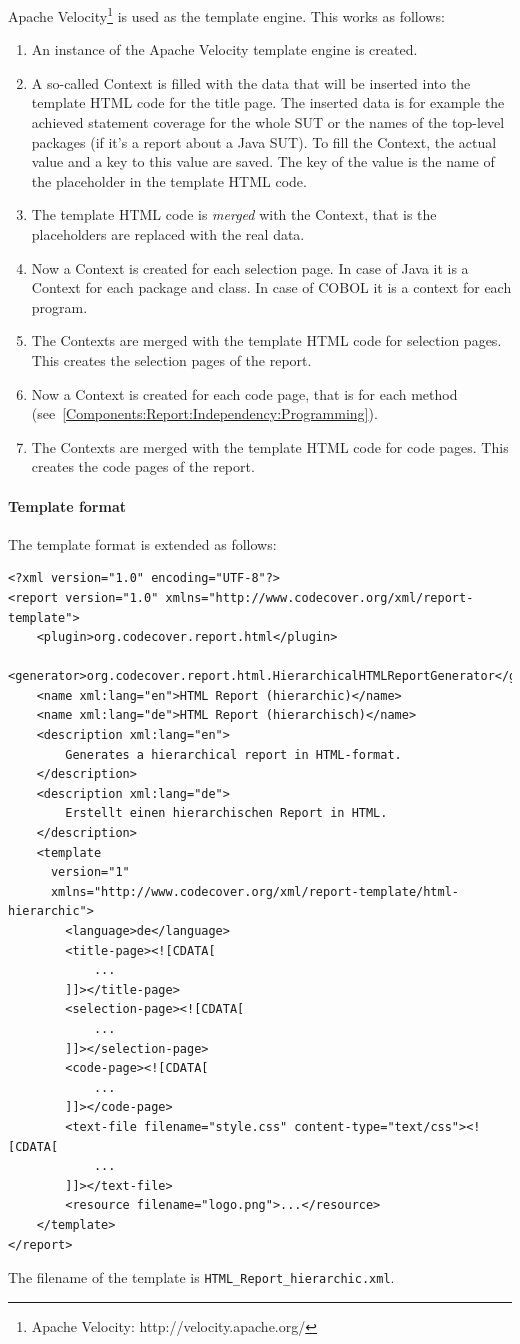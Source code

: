 Apache Velocity\footnote{Apache Velocity: http://velocity.apache.org/} is used as the template engine. This works as follows:
\begin{enumerate}
\item An instance of the Apache Velocity template engine is created.
\item A so-called Context is filled with the data that will be inserted into the template HTML code for the title page. The inserted data is for example the achieved statement coverage for the whole SUT or the names of the top-level packages (if it's a report about a Java SUT). To fill the Context, the actual value and a key to this value are saved. The key of the value is the name of the placeholder in the template HTML code.
\item The template HTML code is \emph{merged} with the Context, that is the placeholders are replaced with the real data.
\item Now a Context is created for each selection page. In case of Java it is a Context for each package and class. In case of COBOL it is a context for each program.
\item The Contexts are merged with the template HTML code for selection pages. This creates the selection pages of the report.
\item Now a Context is created for each code page, that is for each method (see~\ref{Components:Report:Independency:Programming}).
\item The Contexts are merged with the template HTML code for code pages. This creates the code pages of the report.
\end{enumerate}

\paragraph{Template format}

The template format is extended as follows:
\begin{verbatim}
<?xml version="1.0" encoding="UTF-8"?>
<report version="1.0" xmlns="http://www.codecover.org/xml/report-template">
    <plugin>org.codecover.report.html</plugin>
    <generator>org.codecover.report.html.HierarchicalHTMLReportGenerator</generator>
    <name xml:lang="en">HTML Report (hierarchic)</name>
    <name xml:lang="de">HTML Report (hierarchisch)</name>
    <description xml:lang="en">
        Generates a hierarchical report in HTML-format.
    </description>
    <description xml:lang="de">
        Erstellt einen hierarchischen Report in HTML.
    </description>
    <template
      version="1"
      xmlns="http://www.codecover.org/xml/report-template/html-hierarchic">
        <language>de</language>
        <title-page><![CDATA[
            ...
        ]]></title-page>
        <selection-page><![CDATA[
            ...
        ]]></selection-page>
        <code-page><![CDATA[
            ...
        ]]></code-page>
        <text-file filename="style.css" content-type="text/css"><![CDATA[
            ...
        ]]></text-file>
        <resource filename="logo.png">...</resource>
    </template>
</report>
\end{verbatim}
The filename of the template is \texttt{HTML\_Report\_hierarchic.xml}.


